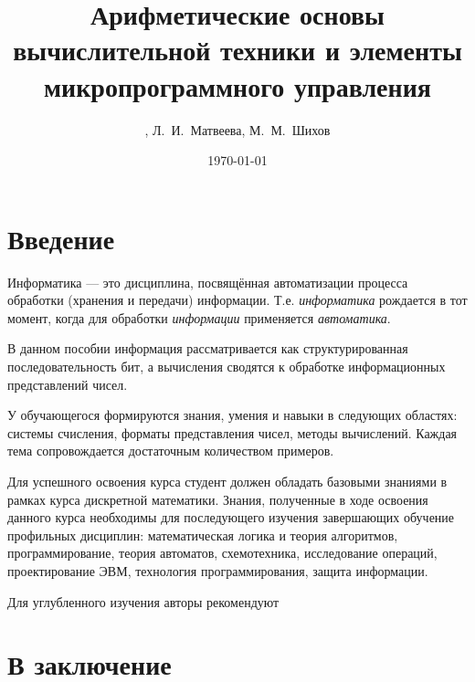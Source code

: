 \documentclass[a4paper,oneside,14pt]{scrbook}
\title{Арифметические основы вычислительной техники и элементы микропрограммного управления}
\author{\fbox{Т.~Р.~Фадеева}, Л.~И.~Матвеева, М.~М.~Шихов}
\date{\today}
\begin{document}
    \maketitle
    \tableofcontents

    \chapter*{Введение}
    
    Информатика --- это дисциплина, посвящённая автоматизации процесса обработки (хранения и передачи) информации. Т.е. \emph{информатика} рождается в тот момент, когда для обработки \emph{информации} применяется \emph{автоматика}.
    
    В данном пособии информация рассматривается как структурированная последовательность бит, а вычисления сводятся к обработке информационных представлений чисел.
    
    У обучающегося формируются знания, умения и навыки в следующих областях: системы счисления, форматы представления чисел, методы вычислений. Каждая тема сопровождается достаточным количеством примеров. 
    
    Для успешного освоения курса студент должен обладать базовыми знаниями в рамках курса дискретной математики. Знания, полученные в ходе освоения данного курса необходимы для последующего изучения завершающих обучение профильных дисциплин: математическая логика и теория алгоритмов, программирование, теория автоматов, схемотехника, исследование операций, проектирование ЭВМ, технология программирования, защита информации.
    
    Для углубленного изучения авторы рекомендуют \cite{bib:lisikov:automateBase,bib:saveliev:automateTheory}
    
    
    \chapter*{В заключение}
\end{document}
